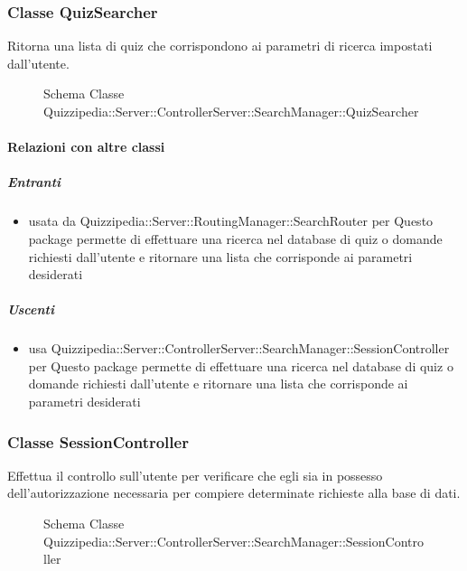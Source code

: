 \subsubsection{Classe QuizSearcher}
Ritorna una lista di quiz che corrispondono ai parametri di ricerca impostati dall'utente.
\begin{figure}[H]
\centering
\noindent{}
\caption[Schema Classe QuizSearcher]{Schema Classe Quizzipedia::Server::ControllerServer::SearchManager::QuizSearcher}
\end{figure}
\paragraph{Relazioni con altre classi}
\subparagraph{Entranti}
\begin{itemize}
\item usata da Quizzipedia::Server::RoutingManager::SearchRouter per Questo package permette di effettuare una ricerca nel database di quiz o domande richiesti dall'utente e ritornare una lista che corrisponde ai parametri desiderati
\end{itemize}
\subparagraph{Uscenti}
\begin{itemize}
\item usa Quizzipedia::Server::ControllerServer::SearchManager::SessionController per Questo package permette di effettuare una ricerca nel database di quiz o domande richiesti dall'utente e ritornare una lista che corrisponde ai parametri desiderati
\end{itemize}
\subsubsection{Classe SessionController}
Effettua il controllo sull'utente per verificare che egli sia in possesso dell'autorizzazione necessaria per compiere determinate richieste alla base di dati.
\begin{figure}[H]
\centering
\noindent{}
\caption[Schema Classe SessionController]{Schema Classe Quizzipedia::Server::ControllerServer::SearchManager::SessionController}
\end{figure}
